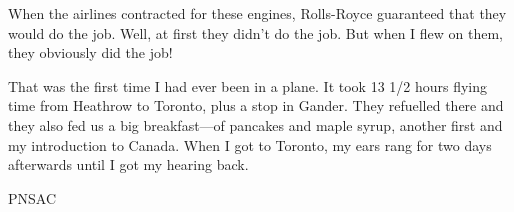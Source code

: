 When the airlines contracted for these engines, Rolls-Royce guaranteed
that they would do the job. Well, at first they didn't do the job. But
when I flew on them, they obviously did the job!

That was the first time I had ever been in a plane. It took 13 1/2
hours flying time from Heathrow to Toronto, plus a stop in
Gander. They refuelled there and they also fed us a big breakfast---of
pancakes and maple syrup, another first and my introduction to
Canada. When I got to Toronto, my ears rang for two days afterwards
until I got my hearing back.



\begin{footnotesize}
    \raggedleft PNSAC\\
\end{footnotesize}



